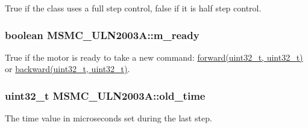True if the class uses a full step control, false if it is half step control. 

\hypertarget{class_m_s_m_c___u_l_n2003_a_a4f2ee51f769815847a2a0062ff03bd6e}{
\subsubsection[{m\+\_\+ready}]{\setlength{\rightskip}{0pt plus 5cm}boolean M\+S\+M\+C\+\_\+\+U\+L\+N2003\+A\+::m\+\_\+ready\hspace{0.3cm}{\ttfamily [private]}}}\label{class_m_s_m_c___u_l_n2003_a_a4f2ee51f769815847a2a0062ff03bd6e}


True if the motor is ready to take a new command\+: \hyperlink{class_m_s_m_c___u_l_n2003_a_a9657492f948a75472b311bc0b823899f}{forward(uint32\+\_\+t, uint32\+\_\+t)} or \hyperlink{class_m_s_m_c___u_l_n2003_a_ac46e6ec6345f95b534079bcf2920885e}{backward(uint32\+\_\+t, uint32\+\_\+t)}. 

\hypertarget{class_m_s_m_c___u_l_n2003_a_adfe160b513e9a51d9fd39bb2424b711b}{
\subsubsection[{old\+\_\+time}]{\setlength{\rightskip}{0pt plus 5cm}uint32\+\_\+t M\+S\+M\+C\+\_\+\+U\+L\+N2003\+A\+::old\+\_\+time\hspace{0.3cm}{\ttfamily [private]}}}\label{class_m_s_m_c___u_l_n2003_a_adfe160b513e9a51d9fd39bb2424b711b}


The time value in microseconds set during the last step. 

